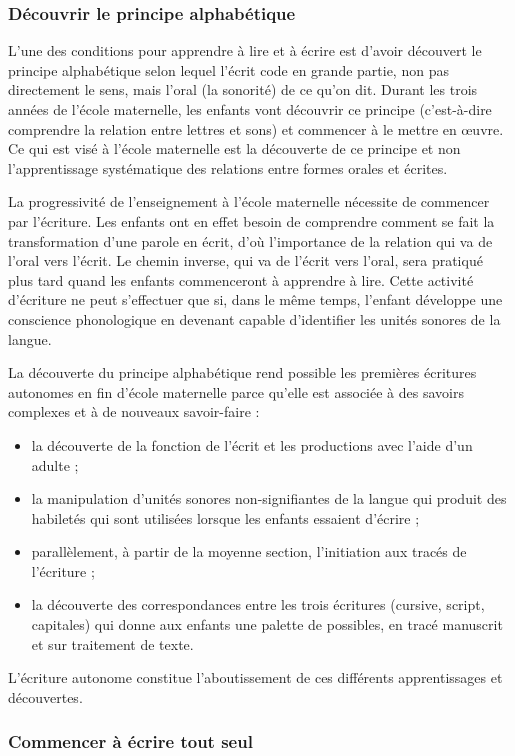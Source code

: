 \subsubsection{Découvrir le principe alphabétique}
L’une des conditions pour apprendre à lire et à écrire est d’avoir découvert le principe alphabétique selon lequel l’écrit code en grande partie, non pas directement le sens, mais l’oral (la sonorité) de ce qu’on dit. Durant les trois années de l’école maternelle, les enfants vont découvrir ce principe (c’est-à-dire comprendre la relation entre lettres et sons) et commencer à le mettre en œuvre. Ce qui est visé à l’école maternelle est la découverte de ce principe et non l’apprentissage systématique des relations entre formes orales et écrites. 

La progressivité de l’enseignement à l’école maternelle nécessite de commencer par l’écriture. Les enfants ont en effet besoin de comprendre comment se fait la transformation d’une parole en écrit, d’où l’importance de la relation qui va de l’oral vers l’écrit. Le chemin inverse, qui va de l’écrit vers l’oral, sera pratiqué plus tard quand les enfants commenceront à apprendre à lire. Cette activité d’écriture ne peut s’effectuer que si, dans le même temps, l’enfant développe une conscience phonologique en devenant capable d’identifier les unités sonores de la langue.

La découverte du principe alphabétique rend possible les premières écritures autonomes en fin d’école maternelle parce qu’elle est associée à des savoirs complexes et à de nouveaux savoir-faire :
\begin{itemize}
\item la découverte de la fonction de l’écrit et les productions avec l’aide d’un adulte ;
\item la manipulation d’unités sonores non-signifiantes de la langue qui produit des habiletés qui sont utilisées lorsque les enfants essaient d’écrire ; 
\item parallèlement, à partir de la moyenne section, l’initiation aux tracés de l’écriture ;
\item la découverte des correspondances entre les trois écritures (cursive, script, capitales) qui donne aux enfants une palette de possibles, en tracé manuscrit et sur traitement de texte.
\end{itemize}

L’écriture autonome constitue l’aboutissement de ces différents apprentissages et découvertes.

\subsubsection{Commencer à écrire tout seul}

